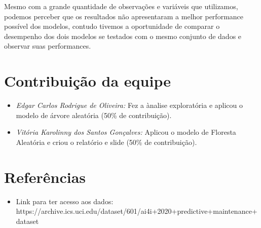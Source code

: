 \documentclass[
  oneclumn]{article}
\providecommand{\tightlist}{%
  \setlength{\itemsep}{0pt}\setlength{\parskip}{0pt}}\usepackage{longtable,booktabs,array}
\begin{document}
Mesmo com a grande quantidade de observações e variáveis que utilizamos,
podemos perceber que os resultados não apresentaram a melhor performance
possível dos modelos, contudo tivemos a oportunidade de comparar o
desempenho dos dois modelos se testados com o mesmo conjunto de dados e
observar suas performances.

\section{Contribuição da equipe}\label{contribuiuxe7uxe3o-da-equipe}

\begin{itemize}
\tightlist
\item
  \emph{Edgar Carlos Rodrigue de Oliveira:} Fez a ànalise exploratória e
  aplicou o modelo de árvore aleatória (50\% de contribuição).
\item
  \emph{Vitória Karolinny dos Santos Gonçalves:} Aplicou o modelo de
  Floresta Aleatória e criou o relatório e slide (50\% de contribuição).
\end{itemize}

\section{Referências}\label{referuxeancias}

\begin{itemize}
\tightlist
\item
  Link para ter acesso aos dados:
  https://archive.ics.uci.edu/dataset/601/ai4i+2020+predictive+maintenance+dataset
\end{itemize}
\end{document}
